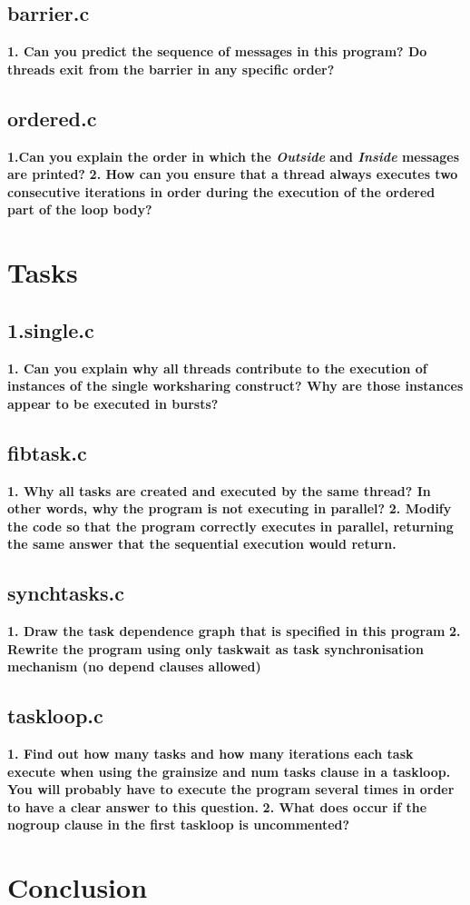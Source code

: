 \documentclass[12]{article}
\begin{document}
\subsection{barrier.c}
\textbf{1. Can you predict the sequence of messages in this program? Do threads exit from the barrier
in any specific order?}
\subsection{ordered.c}
\textbf{1.Can you explain the order in which the \textit{Outside} and \textit{Inside} messages are printed?}
\textbf{2. How can you ensure that a thread always executes two consecutive iterations in order during the execution of the ordered part of the loop body?}

\section{Tasks}
\subsection{1.single.c}
\textbf{1. Can you explain why all threads contribute to the execution of instances of the single worksharing
construct? Why are those instances appear to be executed in bursts?}
\subsection{fibtask.c}
\textbf{1. Why all tasks are created and executed by the same thread? In other words, why the program
is not executing in parallel?}
\textbf{2. Modify the code so that the program correctly executes in parallel, returning the same answer
that the sequential execution would return.}
\subsection{synchtasks.c}
\textbf{1. Draw the task dependence graph that is specified in this program}
\textbf{2. Rewrite the program using only taskwait as task synchronisation mechanism (no depend clauses allowed)}
\subsection{taskloop.c}
\textbf{1. Find out how many tasks and how many iterations each task execute when using the grainsize
and num tasks clause in a taskloop. You will probably have to execute the program several times in order to have a clear answer to this question.}
\textbf{2. What does occur if the nogroup clause in the first taskloop is uncommented?}

\section{Conclusion}
\end{document}
